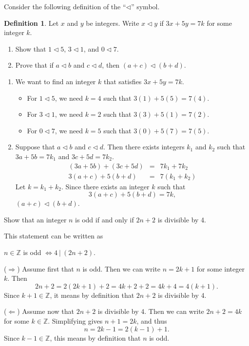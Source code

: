 \documentclass{article}
\theoremstyle{definition}
\newtheorem*{definition}{Definition}
\begin{document}
\begin{question}
    Consider the following definition of the ``$\triangleleft$'' symbol.
	\begin{definition}
	 Let $x$ and $y$ be integers. Write $x\triangleleft y$ if $3x+5y=7k$ for some integer $k$.
	\end{definition}
        \begin{enumerate}
           \item Show that $1\triangleleft 5$, $3\triangleleft 1$, and $0\triangleleft 7$.
           \item Prove that if $a\triangleleft b$ and $c\triangleleft d$, then $(a+c) \triangleleft (b+d)$.
        \end{enumerate}
\end{question}
\begin{solution}
    \begin{enumerate}
      \item We want to find an integer $k$ that satisfies $3x+5y=7k$.
	\begin{itemize}
	\item For $1\triangleleft 5$, we need $k=4$ such that $3(1)+5(5)=7(4)$.
	\item For $3\triangleleft 1$, we need $k=2$ such that $3(3)+5(1)=7(2)$.
	\item For $0\triangleleft 7$, we need $k=5$ such that $3(0)+5(7)=7(5)$.
	\end{itemize}
      \item Suppose that $a\triangleleft b$ and $c\triangleleft d$. Then there exists integers $k_1$ and $k_2$ such that $3a+5b=7k_1$ and $3c+5d=7k_2$.
	    \begin{eqnarray*}
	    (3a+5b) + (3c+5d) &=& 7k_1 + 7k_2\\
	    3(a+c) + 5(b + d) &=& 7(k_1+k_2)
	    \end{eqnarray*}
	Let $k=k_1+k_2$. Since there exists an integer $k$ such that 
	$$3(a+c) + 5(b + d)=7k,$$ $(a+c) \triangleleft (b+d)$.
    \end{enumerate}
\end{solution}

\begin{question}
    Show that an integer $n$ is odd if and only if $2n+2$ is divisible by 4.
\end{question}
\begin{solution}
    This statement can be written as 
	\begin{center}
		$n \in \mathbb{Z}$ is odd $\iff 4 ~|~ (2n+2)$.
	\end{center}
    ($\Rightarrow$) Assume first that $n$ is odd. Then we can write $n = 2k+1$ for some integer $k$. Then
	\[
	2 n + 2 = 2 (2k + 1) + 2 = 4 k + 2 + 2 = 4 k + 4 = 4 (k+1).
	\]
	Since $k+1 \in \mathbb{Z}$, it means by definition that $2 n + 2$ is divisible by 4.
	
    ($\Leftarrow$)  Assume now that $2n + 2$ is divisible by 4. 
    Then we can write $2n + 2 = 4k$ for some $k \in \mathbb{Z}$. Simplifying gives $n + 1 = 2k$, and thus
	\[
	n = 2 k - 1 = 2 (k - 1) + 1.
	\]
    Since $k - 1 \in \mathbb{Z}$, this means by definition that $n$ is odd.
\end{solution}
\end{document}

